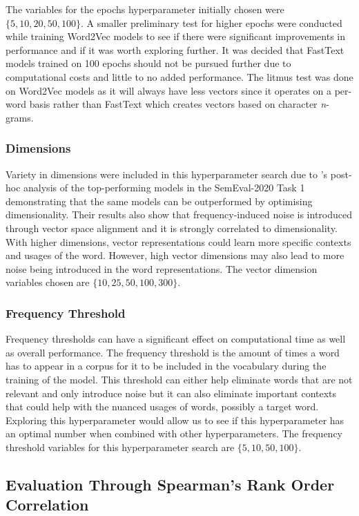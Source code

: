 The variables for the epochs hyperparameter initially chosen were $\{5, 10, 20, 50, 100\}$. A smaller preliminary test for higher epochs were conducted while training Word2Vec models to see if there were significant improvements in performance and if it was worth exploring further. It was decided that FastText models trained on 100 epochs should not be pursued further due to computational costs and little to no added performance. The litmus test was done on Word2Vec models as it will always have less vectors since it operates on a per-word basis rather than FastText which creates vectors based on character \emph{n}-grams. 

\subsubsection{Dimensions}
\label{exp-dims}

Variety in dimensions were included in this hyperparameter search due to \citet{kaiser-etal-2020-ims}’s post-hoc analysis of the top-performing models in the SemEval-2020 Task 1 demonstrating that the same models can be outperformed by optimising dimensionality. Their results also show that frequency-induced noise is introduced through vector space alignment and it is strongly correlated to dimensionality. With higher dimensions, vector representations could learn more specific contexts and usages of the word. However, high vector dimensions may also lead to more noise being introduced in the word representations. The vector dimension variables chosen are $\{10, 25, 50, 100, 300\}$.

\subsubsection{Frequency Threshold}
Frequency thresholds can have a significant effect on computational time as well as overall performance. The frequency threshold is the amount of times a word has to appear in a corpus for it to be included in the vocabulary during the training of the model. This threshold can either help eliminate words that are not relevant and only introduce noise but it can also eliminate important contexts that could help with the nuanced usages of words, possibly a target word. Exploring this hyperparameter would allow us to see if this hyperparameter has an optimal number when combined with other hyperparameters. The frequency threshold variables for this hyperparameter search are $\{5, 10, 50, 100\}$.

\subsection{Evaluation Through Spearman's Rank Order Correlation}

